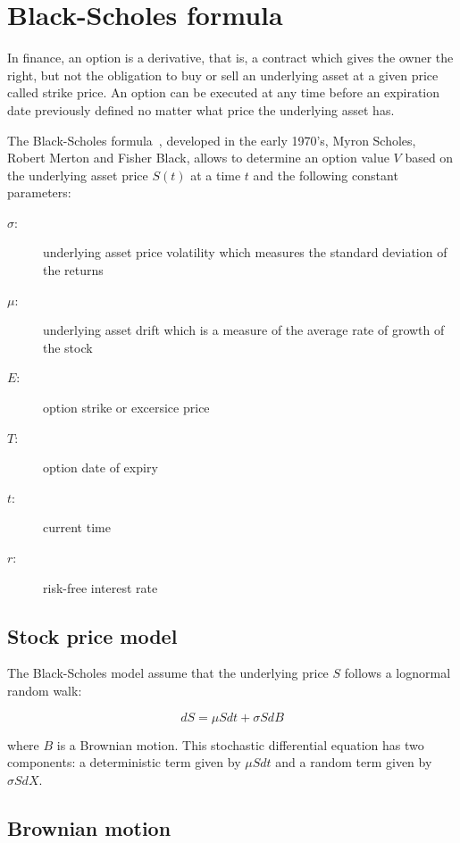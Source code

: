 \section{Black-Scholes formula}

In finance, an option is a derivative, that is, a contract which gives the owner the right, but not the obligation to buy or sell an underlying asset at a given price called strike price. An option can be executed at any time before an expiration date previously defined no matter what price the underlying asset has. 

The Black-Scholes formula~\cite{black1973}, developed in the early 1970's, Myron Scholes, Robert Merton and Fisher Black,  allows to determine an option value $V$ based on the underlying asset price $S(t)$ at a time $t$ and the following constant parameters: 

\begin{description}
\item [$\sigma$:] underlying asset price volatility which measures the standard deviation of the returns
\item [$\mu$:] underlying asset drift which is a measure of the average rate of growth of the stock
\item[$E$:] option strike or excersice price
\item[$T$:] option date of expiry
\item[$t$:] current time
\item[$r$:] risk-free interest rate
\end{description}

\subsection{Stock price model}

The Black-Scholes model assume that the underlying price $S$ follows a lognormal random walk:

\begin{equation}\label{eq:stockprice}
dS = \mu S dt + \sigma S dB
\end{equation}

\noindent where $B$ is a Brownian motion. This stochastic differential equation has two components: a deterministic term given by $\mu S dt$ and a random term given by $\sigma S dX$.

\subsection{Brownian motion}

